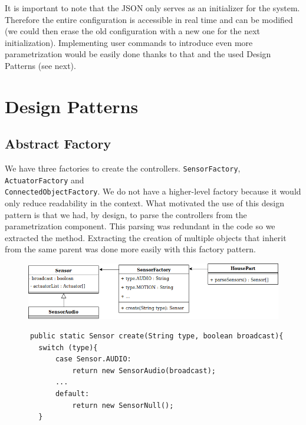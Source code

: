       It is important to note that the JSON only serves as an initializer for the system. Therefore the entire configuration is accessible in real time and can be modified (we could then erase the old configuration with a new one for the next initialization). Implementing user commands to introduce even more parametrization would be easily done thanks to that and the used Design Patterns (see next).

  \section{Design Patterns}
    \subsection{Abstract Factory}
      We have three factories to create the controllers. \texttt{SensorFactory}, \texttt{ActuatorFactory} and \\ \texttt{ConnectedObjectFactory}. We do not have a higher-level factory because it would only reduce readability in the context. What motivated the use of this design pattern is that we had, by design, to parse the controllers from the parametrization component. This parsing was redundant in the code so we extracted the method. Extracting the creation of multiple objects that inherit from the same parent was done more easily with this factory pattern.
      \begin{figure}[!h]
        \includegraphics[width=\textwidth]{sensorfactory.png}
      \end{figure}
      \begin{verbatim}
      public static Sensor create(String type, boolean broadcast){
        switch (type){
            case Sensor.AUDIO:
                return new SensorAudio(broadcast);
            ...
            default:
                return new SensorNull();
        }
      \end{verbatim}

